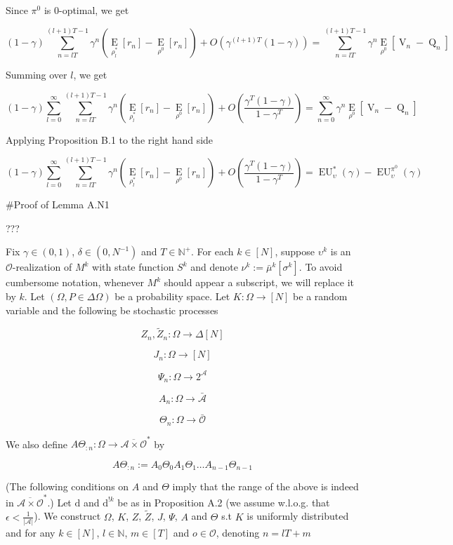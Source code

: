 \documentclass[a4paper]{article}
\newcommand{\Comment}[1]{}
\newcommand{\AP}[1]{\left(#1\right)}
\newcommand{\AB}[1]{\left[#1\right]}
\newcommand{\Ea}[2]{\underset{#1}{\operatorname{E}}\AB{#2}}
\newcommand{\D}{\mathrm{d}}
\newcommand{\Nats}{\mathbb{N}}
\newcommand{\Abs}[1]{\left\vert #1 \right\vert}
\newcommand{\Ob}{\mathcal{O}}
\newcommand{\A}{\mathcal{A}}
\newcommand{\Ado}{\bar{\Ob}}
\newcommand{\Ada}{\bar{\A}}
\newcommand{\Adao}{\overline{\A \times \Ob}}
\newcommand{\Adfh}{\Adao^*}
\newcommand{\V}{\operatorname{V}}
\newcommand{\Q}{\operatorname{Q}}
\newcommand{\EU}{\operatorname{EU}}
\newcommand{\F}{\mathcal{F}}
\newcommand{\Z}{Z}
\newcommand{\J}{J}
\begin{document}
Since $\pi^0$ is 0-optimal, we get

$$(1-\gamma)\sum_{n=lT}^{(l+1)T-1} {\gamma^n\AP{\Ea{\rho^*_l}{r_n}-\Ea{\rho^0}{r_n}}} + O\AP{\gamma^{(l+1)T}(1-\gamma)}= \sum_{n=lT}^{(l+1)T-1}{\gamma^n \Ea{\rho^0}{\V_n-\Q_n}}$$

Summing over $l$, we get

$$(1-\gamma)\sum_{l=0}^\infty\sum_{n=lT}^{(l+1)T-1} {\gamma^n\AP{\Ea{\rho^*_l}{r_n}-\Ea{\rho^0}{r_n}}} + O\AP{\frac{\gamma^T(1-\gamma)}{1-\gamma^{T}}}= \sum_{n=0}^{\infty}{\gamma^n \Ea{\rho^0}{\V_n-\Q_n}}$$

Applying Proposition B.1 to the right hand side

$$(1-\gamma)\sum_{l=0}^\infty\sum_{n=lT}^{(l+1)T-1} {\gamma^n\AP{\Ea{\rho^*_l}{r_n}-\Ea{\rho^0}{r_n}}} + O\AP{\frac{\gamma^T(1-\gamma)}{1-\gamma^{T}}}= \EU_{\upsilon}^{*}(\gamma) - \EU_{\upsilon}^{\pi^0}(\gamma)$$

\#Proof of Lemma A.N1

???

Fix $\gamma \in (0,1)$, $\delta\in\left(0,N^{-1}\right)$ and $T \in \Nats^+$. For each $k \in [N]$, suppose $\upsilon^k$ is an $\Ob$-realization of $M^k$ with state function $S^k$ and denote $\nu^k:=\bar{\mu}^k\left[\sigma^k\right]$. To avoid cumbersome notation, whenever $M^k$ should appear a subscript, we will replace it by $k$. Let $(\Omega,P \in \Delta\Omega)$ be a probability space\Comment{ and $\{\F_n \subseteq 2^\Omega\}_{n \in \Nats \sqcup \{-1\}}$ a filtration of $\Omega$}. Let $K: \Omega \rightarrow [N]$ be \Comment{measurable w.r.t. $\F_{-1}$}a random variable and the following be stochastic processes\Comment{ adapted to $\F$}

$$\Z_n,\tilde{\Z}_n: \Omega \rightarrow \Delta[N]$$

$$\J_n: \Omega \rightarrow [N]$$

$$\Psi_n: \Omega \rightarrow 2^\A$$

$$A_n: \Omega \rightarrow \Ada$$

$$\Theta_n: \Omega \rightarrow \Ado$$

We also define $A\Theta_{:n}: \Omega \rightarrow \Adfh$ by

$$A\Theta_{:n}:= A_0\Theta_0A_1\Theta_1 \ldots A_{n-1}\Theta_{n-1}$$

(The following conditions on $A$ and $\Theta$ imply that the range of the above is indeed in $\Adfh$.) Let $\D$ and $\D^{!k}$ be as in Proposition A.2 (we assume w.l.o.g. that $\epsilon < \frac{1}{\Abs{\A}}$). We construct $\Omega$\Comment{, $\F$}, $K$, $\Z$, $\tilde{\Z}$, $\J$, $\Psi$, $A$ and $\Theta$ s.t $K$ is uniformly distributed and for any $k \in [N]$, $l \in \Nats$, $m \in [T]$ and $o \in \Ob$, denoting $n = lT+m$
\end{document}
